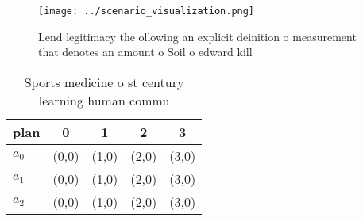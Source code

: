 \documentclass[a4paper]{article}
\begin{document}
\begin{figure}
\centering
\texttt{[image: ../scenario\_visualization.png]}
\caption{Lend legitimacy the ollowing an explicit deinition o measurement that denotes an amount o Soil o edward kill 
}
\end{figure}
 
\begin{table}
\begin{adjustbox}{width=0.6\columnwidth}
\begin{tabular}{|l|l|l|l|l|}
\hline
\textbf{plan} & \multicolumn{1}{c|}{\textbf{0}} & \multicolumn{1}{c|}{\textbf{1}} & \multicolumn{1}{c|}{\textbf{2}} & \multicolumn{1}{c|}{\textbf{3}} \\ \hline
\textbf{$a_0$}  & (0,0) & (1,0) & (2,0) & (3,0) \\ \hline
\textbf{$a_1$}  & (0,0) & (1,0) & (2,0) & (3,0) \\ \hline
\textbf{$a_2$}  & (0,0) & (1,0) & (2,0) & (3,0) \\ \hline
\end{tabular}
\end{adjustbox}
\caption{Sports medicine o st century learning human commu
}
\end{table}
\end{document}
